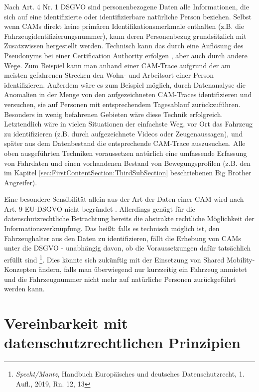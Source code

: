Nach Art. 4 Nr. 1 DSGVO sind personenbezogene Daten alle Informationen, die sich auf eine identifizierte oder identifizierbare natürliche Person beziehen. Selbst wenn CAMs direkt keine primären Identifikationsmerkmale enthalten (z.B. die Fahrzeugidentifizierungsnummer), kann deren Personenbezug grundsätzlich mit Zusatzwissen hergestellt werden. Technisch kann das durch eine Auflösung des Pseudonyms bei einer Certification Authority erfolgen \cite{Kiometzis2017}, aber auch durch andere Wege. Zum Beispiel kann man anhand einer CAM-Trace aufgrund der am meisten gefahrenen Strecken den Wohn- und Arbeitsort einer Person identifizieren. Außerdem wäre es zum Beispiel möglich, durch Datenanalyse die Anomalien in der Menge von den aufgezeichneten CAM-Traces identifizieren und versuchen, sie auf Personen mit entsprechendem Tagesablauf zurückzuführen. Besonders in wenig befahrenen Gebieten wäre diese Technik erfolgreich. Letztendlich wäre in vielen Situationen der einfachste Weg, vor Ort das Fahrzeug zu identifizieren (z.B. durch aufgezeichnete Videos oder Zeugenaussagen), und später aus dem Datenbestand die entsprechende CAM-Trace auszusuchen. Alle oben ausgeführten Techniken voraussetzen natürlich eine umfassende Erfassung von Fahrdaten und einen vorhandenen Bestand von Bewegungsprofilen (z.B. den im Kapitel \ref{sec:FirstContentSection:ThirdSubSection} beschriebenen Big Brother Angreifer).

Eine besondere Sensibilität allein aus der Art der Daten einer CAM wird nach Art. 9 EU-DSGVO nicht begründet \cite{Weichert2016}. Allerdings genügt für die datenschutzrechtliche Betrachtung bereits die abstrakte rechtliche Möglichkeit der Informationsverknüpfung. Das heißt: falls es technisch möglich ist, den Fahrzeughalter aus den Daten zu identifizieren, fällt die Erhebung von CAMs unter die DSGVO - unabhängig davon, ob die Voraussetzungen dafür tatsächlich erfüllt sind  \footnote{\emph{Specht/Mantz}, Handbuch Europäisches und deutsches Datenschutzrecht, 1. Aufl., 2019, Rn. 12, 13}. Dies könnte sich zukünftig mit der Einsetzung von Shared Mobility-Konzepten ändern, falls man überwiegend nur kurzzeitig ein Fahrzeug anmietet und die Fahrzeugnummer nicht mehr auf natürliche Personen zurückgeführt werden kann. 


\section{Vereinbarkeit mit datenschutzrechtlichen Prinzipien}
\label{ch:ThirdContentSection}

